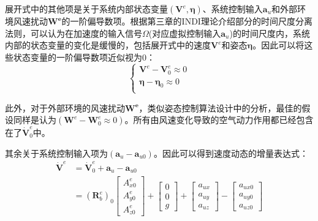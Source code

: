 展开式中的其他项是关于系统内部状态变量$(\boldsymbol{V}^e,\boldsymbol{\eta})$、系统控制输入$\boldsymbol{a}_{u}$和外部环境风速扰动$\boldsymbol{W^e}$的一阶偏导数项。根据第三章的INDI理论介绍部分的时间尺度分离法则，可以认为在加速度的输入信号$\Omega$(对应虚拟控制输入$\boldsymbol{a}_u$)的时间尺度内，系统内部的状态变量的变化是缓慢的，包括展开式中的速度$\boldsymbol{V}^e$和姿态$\boldsymbol{\eta}$。因此可以将这些状态变量的一阶偏导数项近似视为0：
\begin{equation}
    \begin{cases}
        \boldsymbol{V}^e-\boldsymbol{V}_0^e\approx0 \\
        \boldsymbol{\eta}-\boldsymbol{\eta}_0\approx0 \\
    \end{cases}
    \label{4_12}
\end{equation}

此外，对于外部环境的风速扰动$\boldsymbol{W^e}$，类似姿态控制算法设计中的分析，最佳的假设同样是认为$(\boldsymbol{W}^e-\boldsymbol{W}_0^e\approx0)$。所有由风速变化导致的空气动力作用都已经包含在了$\dot{\boldsymbol{V}}^e_0$中。

其余关于系统控制输入项为$(\boldsymbol{a}_{u}-\boldsymbol{a}_{u0})$。因此可以得到速度动态的增量表达式：
\begin{equation}
    \begin{aligned}
        \boldsymbol{\dot{V}}^e&=\boldsymbol{\dot{V}}^e_0+\boldsymbol{a}_{u}-\boldsymbol{a}_{u0}\\
        &=(\boldsymbol{R}_b^e)_0\begin{bmatrix}A_{x0}^e \\A_{y0}^e \\A_{z0}^e\end{bmatrix}+
        \begin{bmatrix}0 \\0 \\g\end{bmatrix}+
        \begin{bmatrix}a_{ux} \\a_{uy} \\a_{uz}\end{bmatrix}-
        \begin{bmatrix}a_{ux0} \\a_{uy0} \\a_{uz0}\end{bmatrix}
    \end{aligned}
    \label{4_13}
\end{equation}

